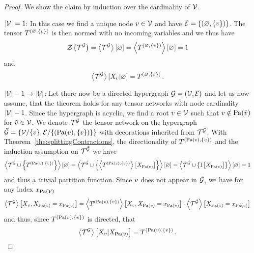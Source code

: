 \begin{proof}
    We show the claim by induction over the cardinality of $\mathcal{V}$.

    $\left|\mathcal{V}\right|=1$: In this case we find a unique node $v\in\mathcal{V}$ and have $\mathcal{E}=\{(\varnothing,\{v\})\}$.
    The tensor $T^{(\varnothing,\{v\})}$ is then normed with no incoming variables and we thus have
    \[ \mathcal{Z}\left(\mathcal{T}^{\mathcal{G}}\right) = \left\langle \mathcal{T}^{\mathcal{G}}\right\rangle \left[ \varnothing \right] = \left\langle T^{(\varnothing,\{v\})}\right\rangle \left[ \varnothing \right] = 1 \]
    and
    \[ \left\langle \mathcal{T}^{\mathcal{G}}\right\rangle \left[ X_{v} | \varnothing \right] = T^{(\varnothing,\{v\})} \, .  \]

    $\left|\mathcal{V}\right|-1 \rightarrow \left|\mathcal{V}\right|$: Let there now be a directed hypergraph $\mathcal{G}=(\mathcal{V},\mathcal{E})$ and let us now assume, that the theorem holds for any tensor networks with node cardinality $\left|\mathcal{V}\right|-1$.
    Since the hypergraph is acyclic, we find a root $v\in\mathcal{V}$ such that $v\notin\mathrm{Pa}(\tilde{v})$ for $\tilde{v}\in\mathcal{V}$.
    We denote $\mathcal{T}^{\tilde{\mathcal{G}}}$ the tensor network on the hypergraph $\tilde{\mathcal{G}}=\{\mathcal{V}/\{v\},\mathcal{E}/\{(\mathrm{Pa}(v),\{v\})\}\}$ with decorations inherited from $\mathcal{T}^{\mathcal{G}}$.
    With Theorem~\ref{the:splittingContractions}, the directionality of $T^{(\mathrm{Pa}(v),\{v\})}$ and the induction assumption on $\mathcal{T}^{\tilde{\mathcal{G}}}$ we have
    \begin{align*}
        \left\langle \mathcal{T}^{\tilde{\mathcal{G}}}\cup\left\{T^{(\mathrm{Pa}(v),\{v\})}\right\}\right\rangle \left[ \varnothing \right]
        = \left\langle \mathcal{T}^{\tilde{\mathcal{G}}}\cup\left\{\left\langle T^{(\mathrm{Pa}(v),\{v\})}\right\rangle \left[ X_{\mathrm{Pa}(v)} \right]\right\}\right\rangle \left[ \varnothing \right]
        = \left\langle \mathcal{T}^{\tilde{\mathcal{G}}}\cup\left\{\mathbb{I}\left[X_{\mathrm{Pa}(v)}\right]\right\}\right\rangle \left[ \varnothing \right]
        = 1
    \end{align*}
    and thus a trivial partition function.
    Since $v$ does not appear in $\tilde{\mathcal{G}}$, we have for any index $x_{\mathrm{Pa}(\mathcal{V})}$
    \begin{align*}
        \left\langle \mathcal{T}^{\mathcal{G}}\right\rangle \left[ X_{v},X_{\mathrm{Pa}(v)}=x_{\mathrm{Pa}(v)} \right]
        = \left\langle T^{(\mathrm{Pa}(v),\{v\})}\right\rangle \left[ X_{v},X_{\mathrm{Pa}(v)}=x_{\mathrm{Pa}(v)} \right]
        \cdot \left\langle \mathcal{T}^{\tilde{\mathcal{G}}}\right\rangle \left[ X_{\mathrm{Pa}(v)}=x_{\mathrm{Pa}(v)} \right]
    \end{align*}
    and thus, since $T^{(\mathrm{Pa}(v),\{v\})}$ is directed, that
    \begin{align*}
        \left\langle \mathcal{T}^{\mathcal{G}}\right\rangle \left[ X_{v} | X_{\mathrm{Pa}(v)} \right]
        = T^{(\mathrm{Pa}(v),\{v\})} \, .
    \end{align*}
\end{proof}

